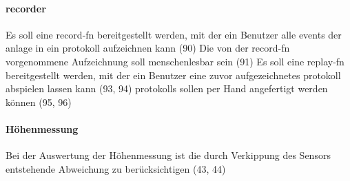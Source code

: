 \paragraph{\gls{recorder}}
\begin{itemize}
     Es soll eine \gls{record-fn} bereitgestellt werden, mit der ein Benutzer alle
    \glspl{event} der \gls{anlage} in ein \gls{protokoll} aufzeichnen kann (90)
     Die von der \gls{record-fn} vorgenommene Aufzeichnung soll menschenlesbar sein (91)
     Es soll eine \gls{replay-fn} bereitgestellt werden, mit der ein
    Benutzer eine zuvor aufgezeichnetes \gls{protokoll} abspielen lassen kann (93, 94)
     \glspl{protokoll} sollen per Hand angefertigt werden können (95, 96)
\end{itemize}

\paragraph{Höhenmessung}
\begin{itemize}
     Bei der Auswertung der Höhenmessung ist die durch Verkippung des Sensors entstehende Abweichung zu berücksichtigen (43, 44)
\end{itemize}

